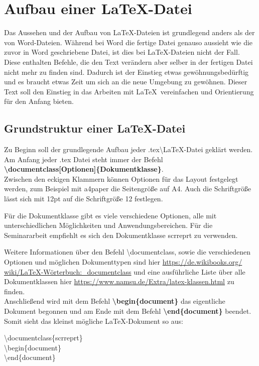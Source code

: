 \documentclass[a4paper, 12pt]{scrreprt}
\begin{document}
\chapter{Aufbau einer \LaTeX -Datei}
Das Aussehen und der Aufbau von \LaTeX -Dateien ist grundlegend anders als der von Word-Dateien. Während bei Word die fertige Datei genauso aussieht wie die zuvor in Word geschriebene Datei, ist dies bei \LaTeX-Dateien nicht der Fall. Diese enthalten Befehle, die den Text verändern aber selber in der fertigen Datei nicht mehr zu finden sind. Dadurch ist der Einstieg etwas gewöhnungsbedürftig und es braucht etwas Zeit um sich an die neue Umgebung zu gewöhnen. Dieser Text soll den Einstieg in das Arbeiten mit \LaTeX\, vereinfachen und Orientierung für den Anfang bieten.\\

\section{Grundstruktur einer \LaTeX -Datei}
Zu Beginn soll der grundlegende Aufbau jeder .tex\textbackslash \LaTeX -Datei geklärt werden. Am Anfang jeder .tex Datei steht immer der Befehl\\ 
\hspace*{0.5cm}\textbf{\textbackslash documentclass[Optionen]\{Dokumentklasse\}}.\\
Zwischen den eckigen Klammern können Optionen für das Layout festgelegt werden, zum Beispiel mit a4paper die Seitengröße auf A4. Auch die Schriftgröße lässt sich mit 12pt auf die Schriftgröße 12 festlegen. 

Für die Dokumentklasse gibt es viele verschiedene Optionen, alle mit unterschiedlichen Möglichkeiten und Anwendungsbereichen. Für die Seminararbeit empfiehlt es sich den Dokumentklasse scrreprt zu verwenden.

Weitere Informationen über den Befehl \textbackslash documentclass, sowie die verschiedenen Optionen und möglichen Dokumenttypen sind hier \href{https://de.wikibooks.org/wiki/LaTeX-W\%C3\%B6rterbuch:_documentclass}{https://de.wikibooks.org/\\wiki/LaTeX-Wörterbuch:\_documentclass}  und eine ausführliche Liste über alle Dokumentklassen hier \href{https://www.namsu.de/Extra/latex-klassen.html}{https://www.namsu.de/Extra/latex-klassen.html} zu finden.\\

\noindent Anschließend wird mit dem Befehl \textbf{\textbackslash begin\{document\}} das eigentliche Dokument begonnen und am Ende mit dem Befehl \textbf{\textbackslash end\{document\}} beendet.\\
\newpage
Somit sieht das kleinst mögliche \LaTeX -Dokument so aus:\\
\begin{addmargin}{0.5cm}
\textbackslash documentclass\{scrreprt\}\\
\textbackslash begin\{document\}\\
\textbackslash end\{document\}\\
\end{addmargin}
\end{document}
